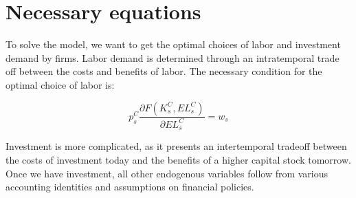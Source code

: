 \section{Necessary equations}
To solve the model, we want to get the optimal choices of labor and investment demand by firms.  Labor demand is determined through an intratemporal trade off between the costs and benefits of labor.  The necessary condition for the optimal choice of labor is: 

\begin{equation}
\label{eqn:foc_l}
p^{C}_{s}\frac{\partial F(K^{C}_{s},EL^{C}_{s})}{\partial EL^{C}_{s}}=w_{s}
\end{equation}

Investment is more complicated, as it presents an intertemporal tradeoff between the costs of investment today and the benefits of a higher capital stock tomorrow.  Once we have investment, all other endogenous variables follow from various accounting identities and assumptions on financial policies.

